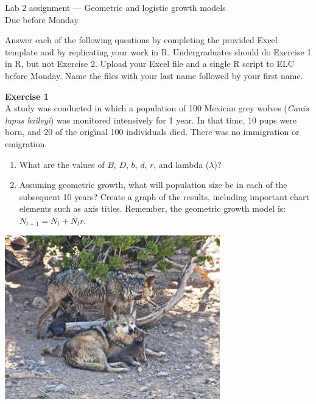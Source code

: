 \documentclass[12pt]{article}\usepackage[]{graphicx}\usepackage[]{xcolor}
\begin{document}
{
  \Large
  \centering
  Lab 2 assignment --- Geometric and logistic growth models \\
  Due before Monday \par
}

Answer each of the following questions by completing the provided Excel 
template and by replicating your work in R. Undergraduates should do
Exercise 1 in R, but not Exercise 2. Upload your Excel file and a
single R script to ELC before Monday. Name the files with your last
name followed by your first name. \\ 

\vspace{12pt}

{\bf Exercise 1 \\}
A study was conducted in which a population of 100 Mexican grey wolves
({\it Canis lupus baileyi}) was monitored intensively for 1 year. In
that time, 10 pups were born, and 20 of the original 100 individuals 
died. There was no immigration or emigration.  

\begin{enumerate}
  \item What are the values of $B$, $D$, $b$, $d$, $r$, and lambda
    ($\lambda$)?
  \item Assuming geometric growth, what will population size be in
    each of the subsequent 10 years? Create a graph of the results,
    including important chart elements such as axis titles. Remember,
    the geometric growth model is: $N_{t+1} = N_t + N_t r$.
\end{enumerate}

\vspace{24pt}

{
  \centering
  \includegraphics[width=0.7\textwidth]{figs/Coronadopack2} \\
}
\end{document}
